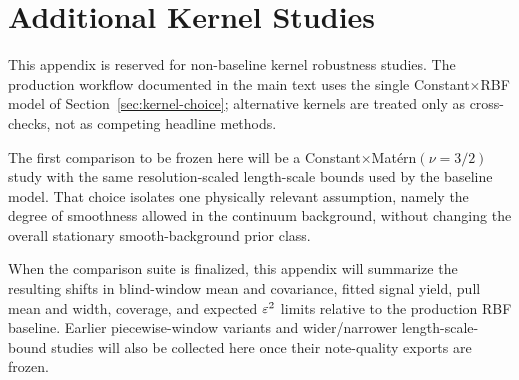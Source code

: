 \section{Additional Kernel Studies}
\label{app:kernel-studies}

This appendix is reserved for non-baseline kernel robustness studies. The production
workflow documented in the main text uses the single Constant$\times$RBF model of
Section~\ref{sec:kernel-choice}; alternative kernels are treated only as cross-checks,
not as competing headline methods.

The first comparison to be frozen here will be a Constant$\times$Mat\'ern$(\nu=3/2)$
study with the same resolution-scaled length-scale bounds used by the baseline model.
That choice isolates one physically relevant assumption, namely the degree of smoothness
allowed in the continuum background, without changing the overall stationary
smooth-background prior class.

When the comparison suite is finalized, this appendix will summarize the resulting
shifts in blind-window mean and covariance, fitted signal yield, pull mean and width,
coverage, and expected $\varepsilon^2$ limits relative to the production RBF baseline.
Earlier piecewise-window variants and wider/narrower length-scale-bound studies will
also be collected here once their note-quality exports are frozen.

